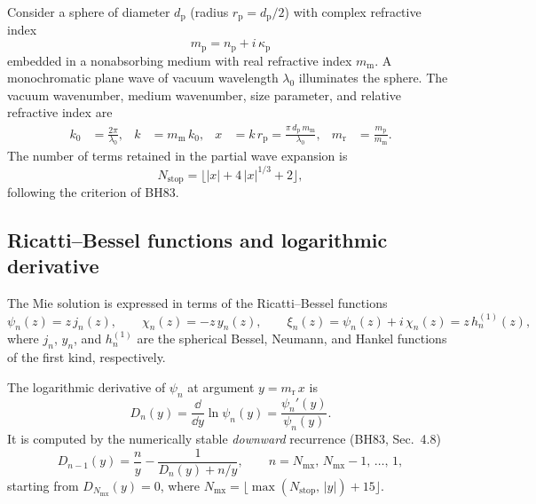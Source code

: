 \documentclass[a4paper,11pt]{article}
\begin{document}
Consider a sphere of diameter $d_\mathrm{p}$ (radius
$r_\mathrm{p} = d_\mathrm{p}/2$) with complex refractive index
\begin{equation}
  m_\mathrm{p} = n_\mathrm{p} + i\, \kappa_\mathrm{p}
  \label{eq:mp-def}
\end{equation}
embedded in a nonabsorbing medium with real refractive index $m_\mathrm{m}$.
A monochromatic plane wave of vacuum wavelength $\lambda_0$ illuminates the
sphere.  The vacuum wavenumber, medium wavenumber, size parameter, and relative
refractive index are
\begin{align}
  k_0 &= \frac{2\pi}{\lambda_0},
  &
  k   &= m_\mathrm{m}\, k_0,
  &
  x   &= k\, r_\mathrm{p}
       = \frac{\pi\, d_\mathrm{p}\, m_\mathrm{m}}{\lambda_0},
  &
  m_\mathrm{r} &= \frac{m_\mathrm{p}}{m_\mathrm{m}}.
  \label{eq:basic-params}
\end{align}
The number of terms retained in the partial wave expansion is
\begin{equation}
  N_\mathrm{stop} = \lfloor |x| + 4\,|x|^{1/3} + 2 \rfloor,
  \label{eq:nstop}
\end{equation}
following the criterion of BH83.

\subsection{Ricatti--Bessel functions and logarithmic derivative}
\label{sec:ricatti-bessel}

The Mie solution is expressed in terms of the Ricatti--Bessel functions
\begin{equation}
  \psi_n(z) = z\, j_n(z),
  \qquad
  \chi_n(z) = -z\, y_n(z),
  \qquad
  \xi_n(z) = \psi_n(z) + i\,\chi_n(z) = z\, h_n^{(1)}(z),
  \label{eq:ricatti-bessel-def}
\end{equation}
where $j_n$, $y_n$, and $h_n^{(1)}$ are the spherical Bessel, Neumann, and
Hankel functions of the first kind, respectively.

The logarithmic derivative of $\psi_n$ at argument $y = m_\mathrm{r}\, x$ is
\begin{equation}
  D_n(y) = \frac{\dd}{\dd y}\ln \psi_n(y)
         = \frac{\psi_n'(y)}{\psi_n(y)}.
  \label{eq:log-deriv-def}
\end{equation}
It is computed by the numerically stable \emph{downward} recurrence (BH83,
Sec.~4.8)
\begin{equation}
  D_{n-1}(y) = \frac{n}{y} - \frac{1}{D_n(y) + n/y},
  \qquad n = N_\mathrm{mx},\, N_\mathrm{mx}-1,\, \ldots,\, 1,
  \label{eq:log-deriv-recurrence}
\end{equation}
starting from $D_{N_\mathrm{mx}}(y) = 0$, where
$N_\mathrm{mx} = \lfloor \max(N_\mathrm{stop},\, |y|) + 15 \rfloor$.
\end{document}
